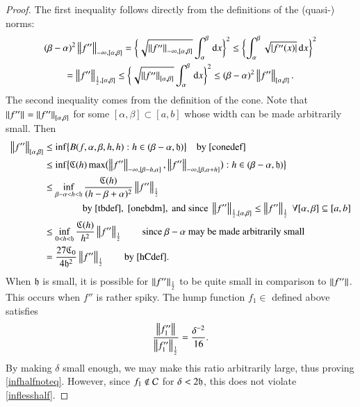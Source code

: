\documentclass[review]{elsarticle}
\theoremstyle{definition}
\begin{document}
\begin{proof}
The first inequality follows directly from the definitions of the (quasi-) norms:
\begin{multline} \label{onebdm}
 (\beta - \alpha)^2 \norm[-\infty,{[\alpha,\beta]}]{f''} = \biggl\{\sqrt{\norm[-\infty,{[\alpha,\beta]}]{f''}}  \int_{\alpha}^{\beta} \, \dif x \biggr\}^2 \le 
 \biggl\{ \int_{\alpha}^{\beta} \sqrt{\abs{f''(x)}} \, \dif x \biggr\}^2\\
 = \norm[\frac 12,{[\alpha,\beta]}]{f''} \le\biggl\{\sqrt{\norm[{[\alpha,\beta]}]{f''}}  \int_{\alpha}^{\beta} \, \dif x \biggr\}^2 \le  (\beta - \alpha)^2 \norm[{[\alpha,\beta]}]{f''}.
\end{multline}
The second inequality comes from the definition of the cone.  Note that $\norm{f''}  = \norm[{[\alpha,\beta]}]{f''}$  for some $[\alpha,\beta] \subset [a,b]$ whose width can be made arbitrarily small.  Then
\begin{align*}
\norm[{[\alpha,\beta]}]{f''}
& \le \inf\bigl\{B(f,\alpha,\beta,h,h) : h \in (\beta - \alpha,\fh) \bigr \} \quad \text{by}~\eqref{conedef} \\
& \le  \inf\bigl\{\fC(h) \max\bigl(\norm[-\infty,{[\beta - h, \alpha]}]{f''},\norm[-\infty,{[\beta, \alpha+h]}]{f''}\bigr) : h \in (\beta - \alpha,\fh) \bigr \} \\
& \le \inf_{\beta - \alpha < h < \fh} \frac{\fC(h)}{(h-\beta+\alpha)^2}\norm[\frac 12]{f''} \\
& \qquad \qquad\text{by}~\eqref{tbdef},~\eqref{onebdm}, \text{ and since }  \norm[{\frac12,[\alpha,\beta]}]{f''} \le \norm[\frac 12]{f''} \ \forall [\alpha,\beta] \subseteq [a,b] \\
& \le \inf_{0 < h < \fh} \frac{\fC(h)}{h^2}\norm[\frac 12]{f''} \qquad \text{since $\beta-\alpha$ may be made arbitrarily small}\\
& = \frac{27\fC_0}{4\fh^2}\norm[\frac 12]{f''} \qquad \text{by \eqref{hCdef}}.
\end{align*}
When $\fh$ is small, it is possible for $\norm[\frac 12]{f''} $ to be quite
small in comparison to $\norm{f''}$. This occurs when $f''$ is rather spiky.
The hump function $f_1 \in $ defined above satisfies
\[
\frac{\norm{f_1''}}{\norm[\frac 12]{f_1''}}  = \frac{ \delta^{-2}}{16}.
\]
By making $\delta$ small enough, we may make this ratio arbitrarily large, thus proving \eqref{infhalfnoteq}. However, since $f_1
\notin \cc$ for $\delta < 2\fh$, this does not violate \eqref{inflesshalf}.
\end{proof}
\end{document}
